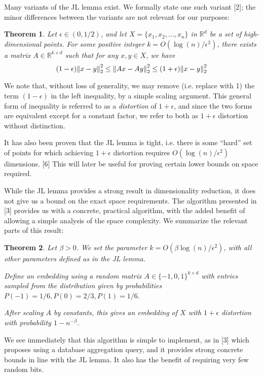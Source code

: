 \documentclass{article}
\newtheorem{theorem}{Theorem}
\begin{document}
Many variants of the JL lemma exist. We formally state one such variant [2]; the
minor differences between the variants are not relevant for our purposes:

\begin{theorem}\label{JL}
  Let $\epsilon \in (0, 1/2)$, and let $X = \{x_1, x_2, ..., x_n\}$ in $\mathbb{R}^d$ be
  a set of high-dimensional points. For some positive integer $k = O(\log
  (n)/\epsilon^2)$, there exists a matrix $A \in \mathbb{R}^{k \times d}$ such that for any
  $x, y \in X$, we have
  $$ (1 - \epsilon)\norm{x - y}_2^2 \leq \norm{Ax - Ay}_2^2 \leq (1 + \epsilon)\norm{x - y}_2^2$$
\end{theorem}

We note that, without loss of generality, we may remove (i.e. replace with 1)
the term $(1 - \epsilon)$ in the left inequality, by a simple scaling argument. This
general form of inequality is referred to as a \textit{distortion} of $1 + \epsilon$,
and since the two forms are equivalent except for a constant factor, we refer to
both as $1 + \epsilon$ distortion without distinction.

It has also been proven that the JL lemma is tight, i.e. there is some ``hard''
set of points for which achieving $1 + \epsilon$ distortion requires $O(\log(n)/ \epsilon^2)$
dimensions. [6] This will later be useful for proving certain lower bounds on
space required.

While the JL lemma provides a strong result in dimensionality reduction, it does
not give us a bound on the exact space requirements. The algorithm presented in
[3] provides us with a concrete, practical algorithm, with the added benefit of
allowing a simple analysis of the space complexity. We summarize the relevant
parts of this result:

\begin{theorem}
  Let $\beta > 0$. We set the parameter $k = O(\beta \log (n) / \epsilon^2)$, with all other
  parameters defined as in the JL lemma.

  Define an embedding using a random matrix $A \in \{-1, 0, 1\}^{k \times d}$ with
  entries sampled from the distribution given by probabilities $P(-1) = 1/6,
  P(0) = 2/3, P(1) = 1/6$.

  After scaling $A$ by constants, this gives an embedding of $X$ with $1 + \epsilon$
  distortion with probability $1 - n^{-\beta}$.
\end{theorem}

We see immediately that this algorithm is simple to implement, as in [3] which
proposes using a database aggregation query, and it provides strong concrete
bounds in line with the JL lemma. It also has the benefit of requiring very few
random bits.
\end{document}
